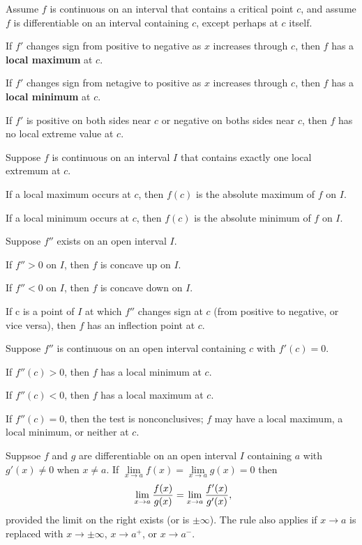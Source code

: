 Assume $f$ is continuous on an interval that contains a critical
point $c$, and assume $f$ is differentiable on an interval containing
$c$, except perhaps at $c$ itself.
\par
If $f'$ changes sign from positive to negative as $x$ increases
through $c$, then $f$ has a {\bf local maximum} at $c$.
\par
If $f'$ changes sign from netagive to positive as $x$ increases
through $c$, then $f$ has a {\bf local minimum} at $c$.
\par
If $f'$ is positive on both sides near $c$ or negative on boths
sides near $c$, then $f$ has no local extreme value at $c$.
\endthm

Suppose $f$ is continuous on an interval $I$ that contains
exactly one local extremum at $c$.
\par
If a local maximum occurs at $c$, then $f(c)$ is the absolute
maximum of $f$ on $I$.
\par
If a local minimum occurs at $c$, then $f(c)$ is the absolute
minimum of $f$ on $I$.
\endthm

Suppose $f''$ exists on an open interval $I$.
\par
If $f'' > 0$ on $I$, then $f$ is concave up on $I$.
\par
If $f'' < 0$ on $I$, then $f$ is concave down on $I$.
\par
If c is a point of $I$ at which $f''$ changes sign at $c$
(from positive to negative, or vice versa), then $f$ has an
inflection point at $c$.
\endthm

Suppose $f''$ is continuous on an open interval containing $c$
with $f'(c) = 0$.
\par
If $f''(c) > 0$, then $f$ has a local minimum at $c$.
\par
If $f''(c) < 0$, then $f$ has a local maximum at $c$.
\par
If $f''(c) = 0$, then the test is nonconclusives; $f$
may have a local maximum, a local minimum, or neither at $c$.
\endthm

Suppsoe $f$ and $g$ are differentiable on an open interval $I$
containing $a$ with $g'(x) \ne 0$ when $x \ne a$.
If $
\lim\limits_{x \to a}f(x) =
\lim\limits_{x \to a}g(x) = 0
$ then
$$\
\lim_{x \to a} {f(x) \over g(x)} =
\lim_{x \to a} {f'(x) \over g'(x)},
$$
provided the limit on the right exists (or is $\pm \infty$).
The rule also applies if $x \to a$ is replaced with $x \to \pm \infty$,
$x \to a^+$, or $x \to a^-$.
\endthm

